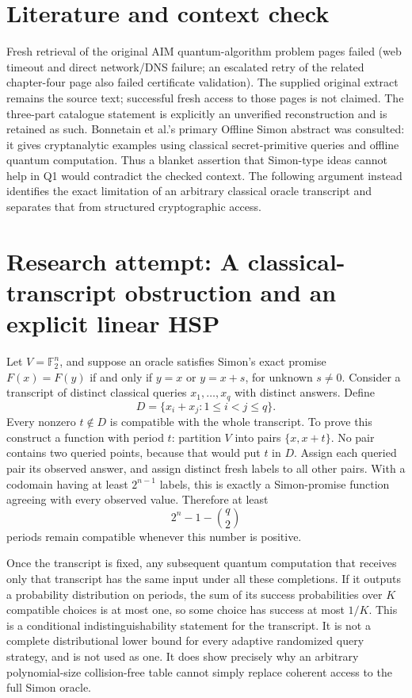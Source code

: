 \documentclass[11pt]{article}
\begin{document}
\section{Literature and context check}
Fresh retrieval of the original AIM quantum-algorithm problem pages failed (web timeout and direct network/DNS failure; an escalated retry of the related chapter-four page also failed certificate validation). The supplied original extract remains the source text; successful fresh access to those pages is not claimed. The three-part catalogue statement is explicitly an unverified reconstruction and is retained as such. Bonnetain et al.'s primary Offline Simon abstract was consulted: it gives cryptanalytic examples using classical secret-primitive queries and offline quantum computation. Thus a blanket assertion that Simon-type ideas cannot help in Q1 would contradict the checked context. The following argument instead identifies the exact limitation of an arbitrary classical oracle transcript and separates that from structured cryptographic access.
\section{Research attempt: A classical-transcript obstruction and an explicit linear HSP}
Let $V=\mathbb F_2^n$, and suppose an oracle satisfies Simon's exact promise $F(x)=F(y)$ if and only if $y=x$ or $y=x+s$, for unknown $s\ne0$. Consider a transcript of distinct classical queries $x_1,\ldots,x_q$ with distinct answers. Define
\[
 D=\{x_i+x_j:1\leq i<j\leq q\}.
\]
Every nonzero $t\notin D$ is compatible with the whole transcript. To prove this construct a function with period $t$: partition $V$ into pairs $\{x,x+t\}$. No pair contains two queried points, because that would put $t$ in $D$. Assign each queried pair its observed answer, and assign distinct fresh labels to all other pairs. With a codomain having at least $2^{n-1}$ labels, this is exactly a Simon-promise function agreeing with every observed value. Therefore at least
\[
 2^n-1-\binom q2
\]
periods remain compatible whenever this number is positive.

Once the transcript is fixed, any subsequent quantum computation that receives only that transcript has the same input under all these completions. If it outputs a probability distribution on periods, the sum of its success probabilities over $K$ compatible choices is at most one, so some choice has success at most $1/K$. This is a conditional indistinguishability statement for the transcript. It is not a complete distributional lower bound for every adaptive randomized query strategy, and is not used as one. It does show precisely why an arbitrary polynomial-size collision-free table cannot simply replace coherent access to the full Simon oracle.
\end{document}
